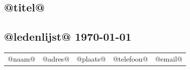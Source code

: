 \documentclass[a4paper]{scrreprt}
\begin{document}
 \begin{landscape}
  \section*{\color{headingkleur}@titel@}
  \subsection*{\color{headingkleur}@ledenlijst@ \today{}}
  \begin{center}
   \begin{tabular}{ l l l l l }
    \rowcolor{headingkleur}
    \color{headingtekstkleur}@naam@ & \color{headingtekstkleur}@adres@ & \color{headingtekstkleur}@plaats@ & \color{headingtekstkleur}@telefoon@ & \color{headingtekstkleur}@email@ \\
   \end{tabular}
  \end{center}
 \end{landscape}
\end{document}
